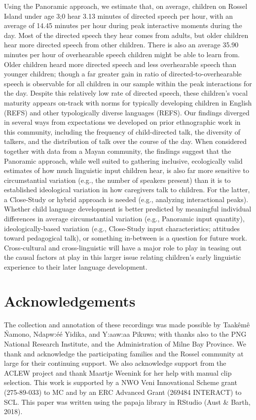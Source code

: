 \documentclass[,man,floatsintext]{apa6}
\begin{document}
Using the Panoramic approach, we estimate that, on average, children on
Rossel Island under age 3;0 hear 3.13 minutes of directed speech per
hour, with an average of 14.45 minutes per hour during peak interactive
moments during the day. Most of the directed speech they hear comes from
adults, but older children hear more directed speech from other
children. There is also an average 35.90 minutes per hour of
overhearable speech children might be able to learn from. Older children
heard more directed speech and less overhearable speech than younger
children; though a far greater gain in ratio of directed-to-overhearable
speech is observable for all children in our sample within the peak
interactions for the day. Despite this relatively low rate of directed
speech, these children's vocal maturity appears on-track with norms for
typically developing children in English (REFS) and other typologically
diverse languages (REFS). Our findings diverged in several ways from
expectations we developed on prior ethnographic work in this community,
including the frequency of child-directed talk, the diversity of
talkers, and the distribution of talk over the course of the day. When
considered together with data from a Mayan community, the findings
suggest that the Panoramic approach, while well suited to gathering
inclusive, ecologically valid estimates of how much linguistic input
children hear, is also far more sensitive to circumstantial variation
(e.g., the number of speakers present) than it is to established
ideological variation in how caregivers talk to children. For the
latter, a Close-Study or hybrid approach is needed (e.g., analyzing
interactional peaks). Whether child language development is better
predicted by meaningful individual differences in average circumstantial
variation (e.g., Panoramic input quantity), ideologically-based
variation (e.g., Close-Study input characteristics; attitudes toward
pedagogical talk), or something in-between is a question for future
work. Cross-cultural and cross-linguistic will have a major role to play
in teasing out the causal factors at play in this larger issue relating
children's early linguistic experience to their later language
development.

\section{Acknowledgements}\label{acknowledgements}

The collection and annotation of these recordings was made possible by
Taakêmê Ńamono, Ndapw:éé Yidika, and Y:aaw:aa Pikuwa; with thanks also
to the PNG National Research Institute, and the Administration of Milne
Bay Province. We thank and acknowledge the participating families and
the Rossel community at large for their continuing support. We also
acknowledge support from the ACLEW project and thank Maartje Weenink for
her help with manual clip selection. This work is supported by a NWO
Veni Innovational Scheme grant (275-89-033) to MC and by an ERC Advanced
Grant (269484 INTERACT) to SCL. This paper was written using the papaja
library in RStudio (Aust \& Barth, 2018).
\end{document}
